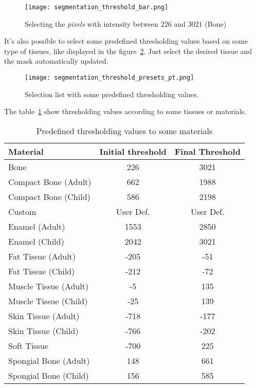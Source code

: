 \begin{figure}[!htb]
\centering
\texttt{[image: segmentation\_threshold\_bar.png]}
\caption{Selecting the \textit{pixels} with intensity between $226$ and $3021$ (Bone)}
\label{fig:region_selection_bar}
\end{figure}

It's also possible to select some predefined thresholding values based on some type of tissues, like displayed in the figure~\ref{fig:limiar_presets}. Just select the desired tissue and the mask automatically updated.

\begin{figure}[!htb]
\centering
\texttt{[image: segmentation\_threshold\_presets\_pt.png]}
\caption{Selection list with some predefined thresholding values.}
\label{fig:limiar_presets}
\end{figure}

The table~\ref{tab:limiar} show thresholding values according to some tissues or materials.

\begin{table}[h]
\centering
\caption{Predefined thresholding values to some materials}
\begin{tabular}{lcc}\\
\hline %
Material & Initial threshold & Final Threshold\\
\hline
\hline
Bone & 226 & 3021\\
Compact Bone (Adult) & 662 & 1988\\
Compact Bone (Child) & 586 & 2198\\
Custom & User Def. & User Def.\\
Enamel (Adult) & 1553 & 2850\\
Enamel (Child) & 2042 & 3021\\
Fat Tissue (Adult) & -205 & -51\\
Fat Tissue (Child) & -212 & -72\\
Muscle Tissue (Adult) & -5 & 135\\
Muscle Tissue (Child) & -25 & 139\\
Skin Tissue (Adult) & -718 & -177\\
Skin Tissue (Child) & -766 & -202\\
Soft Tissue & -700 & 225\\
Spongial Bone (Adult) & 148 & 661\\
Spongial Bone (Child) & 156 & 585\\
\hline
\end{tabular}
\label{tab:limiar}
\end{table}
\newpage

